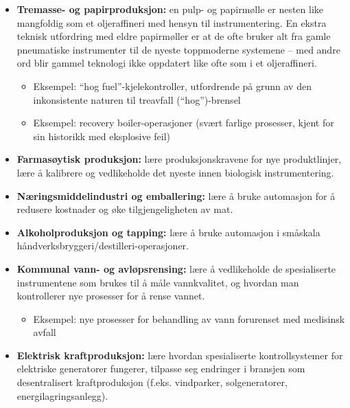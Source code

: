 \begin{itemize}
\begin{itemize}
\item{} Eksempel: utvinning av farlige materialer (f.eks. vannfri ammoniakk, hydrogensulfid)
\end{itemize}
\item{} {\bf Tremasse- og papirproduksjon:} en pulp- og papirmølle er nesten like mangfoldig som et oljeraffineri med hensyn til instrumentering.  En ekstra teknisk utfordring med eldre papirmøller er at de ofte bruker alt fra gamle pneumatiske instrumenter til de nyeste toppmoderne systemene -- med andre ord blir gammel teknologi ikke oppdatert like ofte som i et oljeraffineri.
\begin{itemize}

\item{} Eksempel: ``hog fuel''-kjelekontroller, utfordrende på grunn av den inkonsistente naturen til treavfall (``hog'')-brensel
\item{} Eksempel: recovery boiler-operasjoner (svært farlige prosesser, kjent for sin historikk med eksplosive feil)
\end{itemize}
\item{} {\bf Farmasøytisk produksjon:} lære produksjonskravene for nye produktlinjer, lære å kalibrere og vedlikeholde det nyeste innen biologisk instrumentering.
\item{} {\bf Næringsmiddelindustri og emballering:} lære å bruke automasjon for å redusere kostnader og øke tilgjengeligheten av mat.
\item{} {\bf Alkoholproduksjon og tapping:} lære å bruke automasjon i småskala håndverksbryggeri/destilleri-operasjoner.
\item{} {\bf Kommunal vann- og avløpsrensing:} lære å vedlikeholde de spesialiserte instrumentene som brukes til å måle vannkvalitet, og hvordan man kontrollerer nye prosesser for å rense vannet.
\begin{itemize}

\item{} Eksempel: nye prosesser for behandling av vann forurenset med medisinsk avfall
\end{itemize}
\item{} {\bf Elektrisk kraftproduksjon:} lære hvordan spesialiserte kontrollsystemer for elektriske generatorer fungerer, tilpasse seg endringer i bransjen som desentralisert kraftproduksjon (f.eks. vindparker, solgeneratorer, energilagringsanlegg).
\begin{itemize}


\end{itemize}
\end{itemize}
